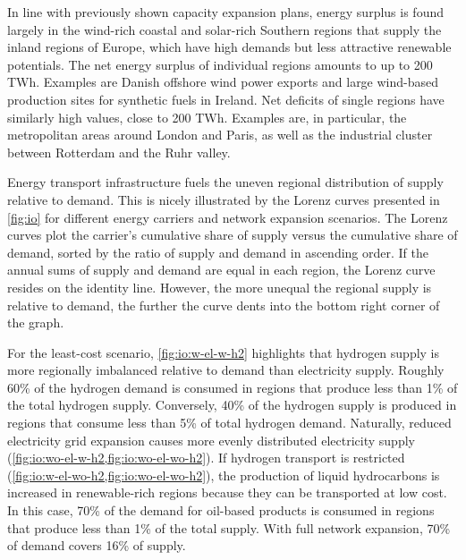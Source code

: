 In line with previously shown capacity expansion plans, energy surplus is found
largely in the wind-rich coastal and solar-rich Southern regions that supply the
inland regions of Europe, which have high demands but less attractive renewable
potentials. The net energy surplus of individual regions amounts to up to 200
TWh. Examples are Danish offshore wind power exports and large wind-based
production sites for synthetic fuels in Ireland. Net deficits of single
regions have similarly high values, close to 200 TWh. Examples are, in
particular, the metropolitan areas around London and Paris, as well as the
industrial cluster between Rotterdam and the Ruhr valley.

Energy transport infrastructure fuels the uneven regional distribution of supply
relative to demand. This is nicely illustrated by the Lorenz curves presented in
\cref{fig:io} for different energy carriers and network expansion scenarios. The
Lorenz curves plot the carrier's cumulative share of supply versus the
cumulative share of demand, sorted by the ratio of supply and demand in
ascending order. If the annual sums of supply and demand are equal in each
region, the Lorenz curve resides on the identity line. However, the more unequal
the regional supply is relative to demand, the further the curve dents into the
bottom right corner of the graph.

For the least-cost scenario, \cref{fig:io:w-el-w-h2} highlights that hydrogen
supply is more regionally imbalanced relative to demand than electricity supply.
Roughly 60\% of the hydrogen demand is consumed in regions that produce less
than 1\% of the total hydrogen supply. Conversely, 40\% of the hydrogen supply
is produced in regions that consume less than 5\% of total hydrogen demand.
Naturally, reduced electricity grid expansion causes more evenly distributed
electricity supply (\cref{fig:io:wo-el-w-h2,fig:io:wo-el-wo-h2}). If hydrogen
transport is restricted (\cref{fig:io:w-el-wo-h2,fig:io:wo-el-wo-h2}), the
production of liquid hydrocarbons is increased in renewable-rich regions because
they can be transported at low cost. In this case, 70\% of the demand for
oil-based products is consumed in regions that produce less than 1\% of the
total supply. With full network expansion, 70\% of demand covers 16\% of supply.


